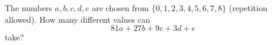 The numbers $a,b,c,d,e$ are chosen from $\{0,1,2,3,4,5,6,7,8\}$ (repetition allowed). How many different values can
\[81a+27b+9c+3d+e\]
take?
